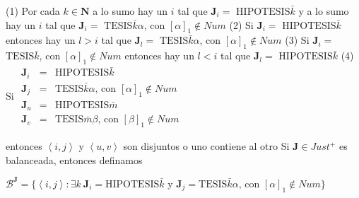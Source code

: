 (1) Por cada \(k\in \mathbf{N}\) a lo sumo hay un \(i\) tal que \(\mathbf{J }_{i}=\) \(\mathrm{HIPOTESIS}\bar{k}\) y a lo sumo hay un \(i\) tal que \(\mathbf{J }_{i}=\) \(\mathrm{TESIS}\bar{k}\alpha \), con \([\alpha ]_{1}\notin Num\)
(2) Si \(\mathbf{J}_{i}=\) \(\mathrm{HIPOTESIS}\bar{k}\) entonces hay un \( l >i\) tal que \(\mathbf{J}_{l}=\) \(\mathrm{TESIS}\bar{k}\alpha \), con \([\alpha ]_{1}\notin Num\)
(3) Si \(\mathbf{J}_{i}=\) \(\mathrm{TESIS}\bar{k}\), con \([\alpha ]_{1}\notin Num\) entonces hay un \(l< i\) tal que \(\mathbf{J}_{l}=\) \(\mathrm{ HIPOTESIS}\bar{k}\)
(4) Si
\(\displaystyle \begin{array}{rcl} \mathbf{J}_{i} & =& \text{HIPOTESIS}\bar{k} \\ \mathbf{J}_{j} & =& \text{TESIS}\bar{k}\alpha \text{, con }[\alpha ]_{1}\notin Num \\ \mathbf{J}_{u} & =& \text{HIPOTESIS}\bar{m} \\ \mathbf{J}_{v} & =& \text{TESIS}\bar{m}\beta \text{, con }[\beta ]_{1}\notin Num \end{array} \)

entonces \(\left\langle i,j\right\rangle \) y \(\left\langle u,v\right\rangle \) son disjuntos o uno contiene al otro
Si \(\mathbf{J}\in Just^{+}\) es balanceada, entonces definamos

\(\displaystyle \mathcal{B}^{\mathbf{J}}=\{\left\langle i,j\right\rangle :\exists k\ \mathbf{ J}_{i}=\text{HIPOTESIS}\bar{k}\text{ y }\mathbf{J}_{j}=\text{TESIS}\bar{k} \alpha \text{, con }[\alpha ]_{1}\notin Num\} \)

